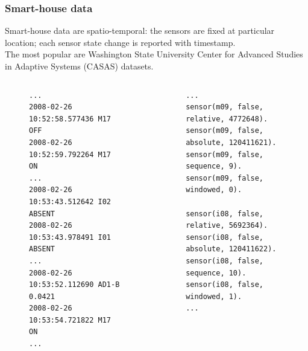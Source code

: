 \documentclass[10pt]{beamer}
\begin{document}
\begin{frame}[fragile]
\frametitle{Smart-house data}
Smart-house data are spatio-temporal: the sensors are fixed at particular location; each sensor state change is reported with timestamp.\\[1em]

The most popular are Washington State University Center for Advanced Studies in Adaptive Systems (CASAS) datasets.
{\tiny
\begin{columns}
\begin{column}{5.4cm}
\begin{example}
\begin{figure}
\lstset{
captionpos=b,
language=HTML,
breaklines=true,
float=tb,
basicstyle=\tiny
}
\begin{lstlisting}
...
2008-02-26 10:52:58.577436 M17   OFF
2008-02-26 10:52:59.792264 M17   ON
...
2008-02-26 10:53:43.512642 I02   ABSENT
2008-02-26 10:53:43.978491 I01   ABSENT
...
2008-02-26 10:53:52.112690 AD1-B 0.0421
2008-02-26 10:53:54.721822 M17   ON
...
\end{lstlisting}
\end{figure}
\end{example}
\end{column}
\begin{column}{5.4cm}
\begin{example}
\begin{figure}
\lstset{
captionpos=b,
language=HTML,
breaklines=true,
float=tb,
basicstyle=\tiny
}
\begin{lstlisting}
...
sensor(m09, false, relative, 4772648).
sensor(m09, false, absolute, 120411621).
sensor(m09, false, sequence, 9).
sensor(m09, false, windowed, 0).

sensor(i08, false, relative, 5692364).
sensor(i08, false, absolute, 120411622).
sensor(i08, false, sequence, 10).
sensor(i08, false, windowed, 1).
...
\end{lstlisting}
\end{figure}
\end{example}
\end{column}
\end{columns}
}
\end{frame}
\end{document}

